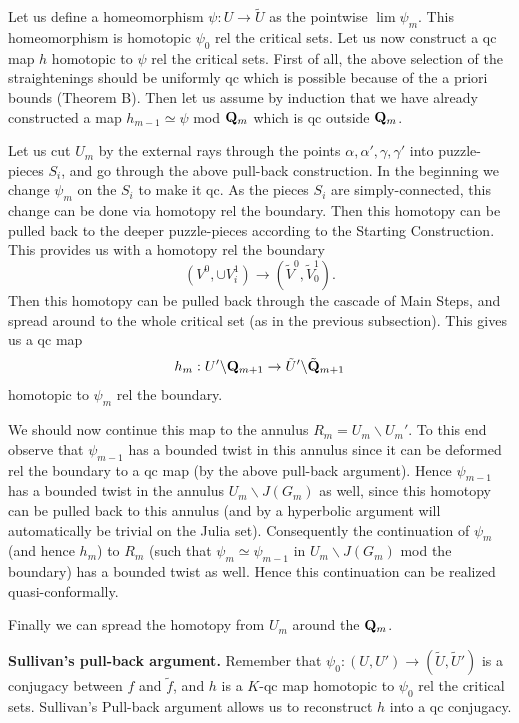 Let us define a homeomorphism $\psi : U\rightarrow \tilde U$ as the pointwise
$\lim\psi_m$. This homeomorphism is homotopic $\psi_0$ rel the critical sets.
Let us now construct a qc map $h$ homotopic to $\psi$ rel the critical sets.
First of all, the above selection of the  straightenings should be uniformly qc
which is possible because of the a priori bounds (Theorem B). 
 Then let us assume by
induction that we have already constructed a map $h_{m-1}\simeq \psi$ mod
${\bf Q}_m$ which is qc outside ${\bf Q}_m$. 

Let us  cut $U_m$ by the external rays through the points $\alpha, \alpha',
\gamma, \gamma'$ into puzzle-pieces $S_i$, and go through the above pull-back
construction. In the beginning we change $\psi_m$ on the $S_i$ to make it qc.
As the pieces $S_i$ are simply-connected, 
this change can be done via homotopy rel the boundary.
Then this homotopy can be pulled back to the deeper puzzle-pieces
according to the Starting Construction. This provides us with a 
homotopy rel the boundary
$$(V^0,\cup V^1_i)\rightarrow (\tilde V^0, \tilde V^1_0).$$
Then this homotopy can be pulled back through the cascade of Main Steps,
and spread around to the whole critical set (as in the previous subsection).
This gives us a qc map 
$$h_m: U'\backslash {\bf Q}_{m+1}\rightarrow \tilde U'\backslash \tilde {\bf Q}_{m+1}$$
homotopic to $\psi_m$ rel the boundary.

We should now continue this map to the annulus $R_m=U_m\backslash U_m'$.
To this end observe that $\psi_{m-1}$ has a bounded twist in this annulus
since it can be deformed rel the boundary to a qc map 
(by the above  pull-back argument).
Hence $\psi_{m-1}$ has a bounded twist in the annulus $U_m\backslash J(G_m)$
 as well, since this homotopy can be pulled back to this annulus (and 
by a hyperbolic argument will
automatically  be trivial on the Julia set).
Consequently the continuation of $\psi_m$ (and hence $h_m$) to $R_m$ (such that
$\psi_m\simeq \psi_{m-1}$ in $U_m\backslash J(G_m)$ mod the boundary)
 has a bounded twist as well. Hence this continuation can be realized
quasi-conformally.

Finally we can spread the homotopy from $U_m$ around the ${\bf Q}_m$.

\medskip\noindent
{\bf Sullivan's pull-back argument.} Remember that 
$\psi_0: (U,U')\rightarrow (\tilde U, \tilde U')$ is a 
conjugacy between $f$ and $\tilde f$, and $h$ is a $K$-qc map homotopic to
$\psi_0$ rel the critical sets. Sullivan's Pull-back argument allows us
to reconstruct $h$ into a qc conjugacy.

